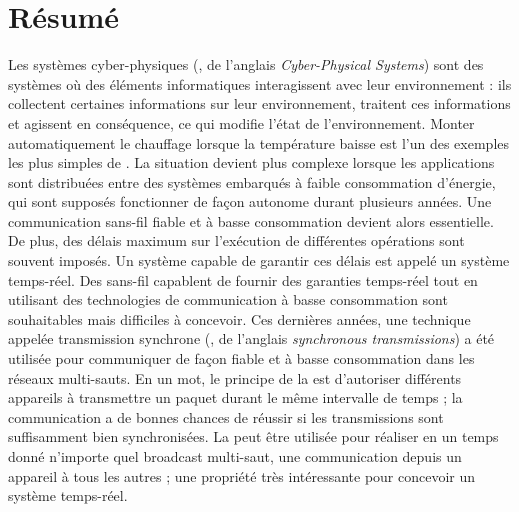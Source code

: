 \chapter{Résumé}

\startsquarepar
Les systèmes cyber-physiques (\CPS, de l'anglais \emph{Cyber-Physical Systems}) sont des systèmes où des éléments informatiques interagissent avec leur environnement : ils collectent certaines informations sur leur environnement, traitent ces informations et agissent en conséquence, ce qui modifie l'état de l'environnement.
Monter automatiquement le chauffage lorsque la température baisse est l'un des exemples les plus simples de \CPS.
%
La situation devient plus complexe lorsque les applications sont distribuées entre des systèmes embarqués à
faible consommation d'énergie, qui sont supposés fonctionner de façon autonome durant plusieurs années.
Une communication sans-fil fiable et à basse consommation devient alors essentielle.
%
De plus, des délais maximum sur l'exécution de différentes opérations sont souvent imposés. Un système capable de garantir ces délais est appelé un système temps-réel.
%
Des \CPS sans-fil  capablent de fournir des garanties temps-réel tout en utilisant des technologies de communication à basse consommation sont souhaitables mais difficiles à concevoir.
Ces dernières années, une technique appelée transmission synchrone (\ST, de l'anglais \emph{synchronous transmissions}) a été utilisée pour communiquer de façon fiable et à basse consommation dans les réseaux multi-sauts.
\linebreak
En un mot, le principe de la \ST est d'autoriser différents appareils à transmettre un paquet durant le même intervalle de temps ; la communication a de bonnes chances de réussir si les transmissions sont suffisamment bien synchronisées.
La \ST peut être utilisée pour réaliser en un temps donné n'importe quel broadcast multi-saut, \cad une communication depuis un appareil à tous les autres ; une propriété très intéressante pour concevoir un système temps-réel.
\stopsquarepar

